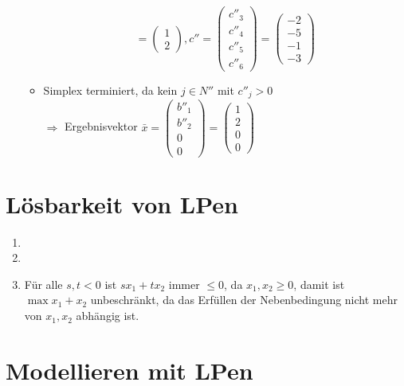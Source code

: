 \documentclass[a4paper,10pt]{article}
\begin{document}
\begin{enumerate}
\begin{itemize}
\[                   = \begin{pmatrix}1 \\ 2\end{pmatrix},
                 c'' = \begin{pmatrix}c''_3 \\ c''_4 \\ c''_5 \\ c''_6\end{pmatrix} 
                   = \begin{pmatrix}-2 \\ -5 \\ -1 \\ -3 \end{pmatrix}
                \]
        \item   Simplex terminiert, da kein $j \in N''$ mit $c''_j > 0$\\
                $\Rightarrow$ Ergebnisvektor $\bar x = \begin{pmatrix}b''_1 \\ b''_2 \\ 0 \\ 0\end{pmatrix} = \begin{pmatrix}1 \\ 2 \\ 0 \\ 0\end{pmatrix}$
        \end{itemize}
\end{enumerate}

\section{Lösbarkeit von LPen}
\begin{enumerate}
\item   
\item   
\item   Für alle $s,t < 0$ ist $sx_1 + tx_2$ immer $\leq 0$, da $x_1, x_2 \geq 0$, damit ist $\max x_1 + x_2$ unbeschränkt, 
        da das Erfüllen der Nebenbedingung nicht mehr von $x_1, x_2$ abhängig ist.
\end{enumerate}

\section{Modellieren mit LPen}



\end{document}
